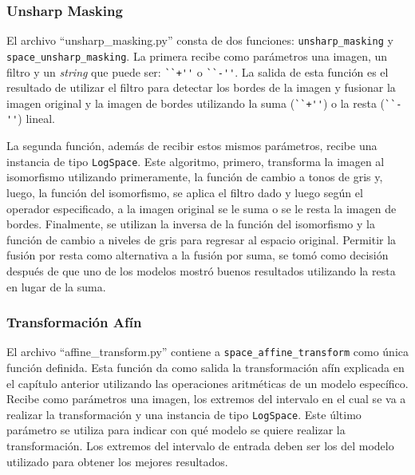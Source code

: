 \subsubsection{Unsharp Masking}

El archivo ``unsharp\_masking.py'' consta de dos funciones: \verb|unsharp_masking| y \verb|space_unsharp_masking|. La primera recibe como par\'ametros una imagen, un filtro y un \textit{string} que puede ser: \verb|``+''| o \verb|``-''|. La salida de esta funci\'on es el resultado de utilizar el filtro para detectar los bordes de la imagen y fusionar la imagen original y la imagen de bordes utilizando la suma (\verb|``+''|) o la resta (\verb|``-''|) lineal. 

La segunda funci\'on, adem\'as de recibir estos mismos par\'ametros, recibe una instancia de tipo \verb|LogSpace|. Este algoritmo, primero, transforma la imagen al isomorfismo utilizando primeramente, la funci\'on de cambio a tonos de gris y, luego, la funci\'on del isomorfismo, se aplica el filtro dado y luego seg\'un el operador especificado, a la imagen original se le suma o se le resta la imagen de bordes. Finalmente, se utilizan la inversa de la funci\'on del isomorfismo y la funci\'on de cambio a niveles de gris para regresar al espacio original. Permitir la fusi\'on por resta como alternativa a la fusi\'on por suma, se tom\'o como decisi\'on despu\'es de que uno de los modelos mostr\'o buenos resultados utilizando la resta en lugar de la suma. 

\subsubsection{Transformaci\'on Af\'in}

El archivo ``affine\_transform.py'' contiene a \verb|space_affine_transform| como \'unica funci\'on definida. Esta funci\'on da como salida la transformaci\'on af\'in explicada en el cap\'itulo anterior utilizando las operaciones aritm\'eticas de un modelo espec\'ifico. Recibe como par\'ametros una imagen, los extremos del intervalo en el cual se va a realizar la transformaci\'on y una instancia de tipo \verb|LogSpace|. Este \'ultimo par\'ametro se utiliza para indicar con qu\'e modelo se quiere realizar la transformaci\'on. Los extremos del intervalo de entrada deben ser los del modelo utilizado para obtener los mejores resultados.

